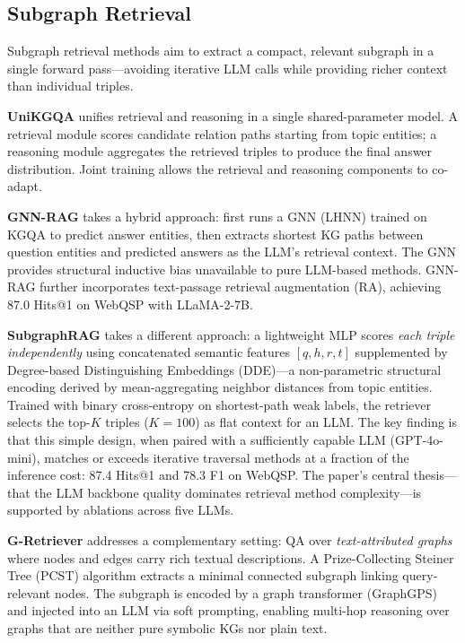 \documentclass[11pt]{article}
\begin{document}
\subsection{Subgraph Retrieval}
\label{sec:subgraph}

Subgraph retrieval methods aim to extract a compact, relevant subgraph in a single forward pass—avoiding iterative LLM calls while providing richer context than individual triples.

\textbf{UniKGQA} \cite{jiang2023unikgqa} unifies retrieval and reasoning in a single shared-parameter model. A retrieval module scores candidate relation paths starting from topic entities; a reasoning module aggregates the retrieved triples to produce the final answer distribution. Joint training allows the retrieval and reasoning components to co-adapt.

\textbf{GNN-RAG} \cite{mavromatis2024gnnrag} takes a hybrid approach: first runs a GNN (LHNN) trained on KGQA to predict answer entities, then extracts shortest KG paths between question entities and predicted answers as the LLM's retrieval context. The GNN provides structural inductive bias unavailable to pure LLM-based methods. GNN-RAG further incorporates text-passage retrieval augmentation (RA), achieving 87.0 Hits@1 on WebQSP with LLaMA-2-7B.

\textbf{SubgraphRAG} \cite{wang2025subgraphrag} takes a different approach: a lightweight MLP scores \emph{each triple independently} using concatenated semantic features $[q, h, r, t]$ supplemented by Degree-based Distinguishing Embeddings (DDE)—a non-parametric structural encoding derived by mean-aggregating neighbor distances from topic entities. Trained with binary cross-entropy on shortest-path weak labels, the retriever selects the top-$K$ triples ($K{=}100$) as flat context for an LLM. The key finding is that this simple design, when paired with a sufficiently capable LLM (GPT-4o-mini), matches or exceeds iterative traversal methods at a fraction of the inference cost: 87.4 Hits@1 and 78.3 F1 on WebQSP. The paper's central thesis—that the LLM backbone quality dominates retrieval method complexity—is supported by ablations across five LLMs.

\textbf{G-Retriever} \cite{he2024gretriever} addresses a complementary setting: QA over \emph{text-attributed graphs} where nodes and edges carry rich textual descriptions. A Prize-Collecting Steiner Tree (PCST) algorithm extracts a minimal connected subgraph linking query-relevant nodes. The subgraph is encoded by a graph transformer (GraphGPS) and injected into an LLM via soft prompting, enabling multi-hop reasoning over graphs that are neither pure symbolic KGs nor plain text.
\end{document}
